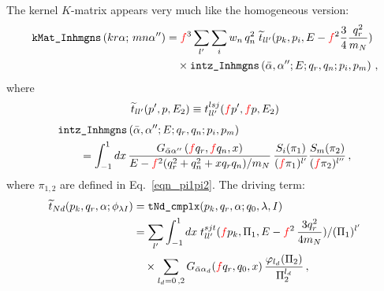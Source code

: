 \documentclass[11pt,aps]{revtex4}
\newcommand{\PF}{{\color{red}f}}
\begin{document}
The kernel $K$-matrix appears very much like the homogeneous version:
\begin{equation}
  \begin{split}
    \texttt{kMat\_Inhmgns}\left(kr\alpha;\, mn\alpha''\right) &= \PF^3 \sum_{l'} \sum_{i} w_n\, q_n^2\; \widetilde{t}_{ll'}(p_k, p_i, E - \PF^2 \frac{3}{4} \frac{q_r^2}{m_N}) \\
  & \quad  \times \texttt{intz\_Inhmgns}\left(\bar{\alpha}, \alpha''; E; q_r, q_n; p_i, p_m\right) \, ,
  \end{split} \label{eqn-kMat-inhomo}
\end{equation}
where
\begin{equation}
  \begin{split}
    \widetilde{t}_{ll'}(p', p, E_2) \equiv t^{lsj}_{ll'}(\PF p', \PF p, E_2)
  \end{split}
\end{equation}
\begin{equation}
\begin{split}
  & \texttt{intz\_Inhmgns}\left(\bar{\alpha}, \alpha''; E; q_r, q_n; p_i, p_m\right) \\
  & \qquad = \int_{-1}^1{dx}\, \frac{G_{\bar{\alpha}\alpha''}\left(\PF q_r, \PF q_n, x\right)}{E - \PF^2 (q_r^2 + {q}_n^2 + x q_r q_n)/m_N}\, \frac{S_i(\pi_1)}{(\PF \pi_1)^{l'}}
  \frac{S_m(\pi_2)}{(\PF \pi_2)^{l''}} \, ,
\end{split}
\end{equation}
where $\pi_{1, 2}$ are defined in Eq.~\eqref{eqn_pi1pi2}.
The driving term:
\begin{equation}
\begin{split}
    \widetilde{t}_{Nd}(p_k, q_r, \alpha; \phi_{\lambda I}) &= \texttt{tNd\_cmplx}(p_k, q_r, \alpha; q_0, \lambda, I) \\
    &= \sum_{l'} \int_{-1}^1 dx\; t_{ll'}^{sjt}  (\PF p_k, \Pi_1, E - \PF^2\,  \frac{3q_r^2}{4m_N}) / (\Pi_1)^{l'} \\
    & \quad \times \sum_{l_d = 0\, , 2}  G_{\bar{\alpha} \alpha_d} (\PF q_r, q_0, x)\, \frac{\varphi_{l_d}(\Pi_2)}{\Pi_2^{l_d}}
    \, ,
\end{split}\label{eqn_tilde_tNd}
\end{equation}
\end{document}

